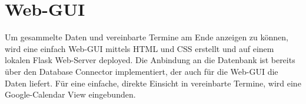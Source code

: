     
    \section{Web-GUI} \label{Realisierung: web gui}
        Um gesammelte Daten und vereinbarte Termine am Ende anzeigen zu können, wird eine einfach Web-GUI mittels HTML und CSS erstellt und auf einem lokalen Flask Web-Server deployed. Die Anbindung an die Datenbank ist bereits über den Database Connector implementiert, der auch für die Web-GUI die Daten liefert. Für eine einfache, direkte Einsicht in vereinbarte Termine, wird eine Google-Calendar View eingebunden. 